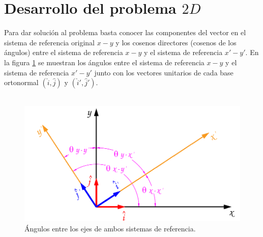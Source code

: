 \documentclass[12pt,letterpaper, twoside, openany]{article}
\begin{document}
\section{Desarrollo del problema $2D$}
%
Para dar solución al problema basta conocer las componentes del vector en el sistema de referencia original $x-y$ y los cosenos directores  (cosenos de los ángulos) entre el sistema de referencia $x-y$ y el sistema de referencia $x'-y'$. En la figura \ref{direc2d} se muestran los ángulos entre el sistema de referencia $x-y$ y el sistema de referencia $x'-y'$ junto con los vectores unitarios de cada base ortonormal $\left( \hat{i}, \hat{j} \right)$ y $\left( \hat{i}', \hat{j}' \right)$.\\\\
%
%
\begin{figure}[H]
	\centering
	\includegraphics[width=15cm]{img/Directores2D.pdf}
	\caption{Ángulos entre los ejes de ambos sistemas de referencia.}
	\label{direc2d}
\end{figure}
\end{document}
